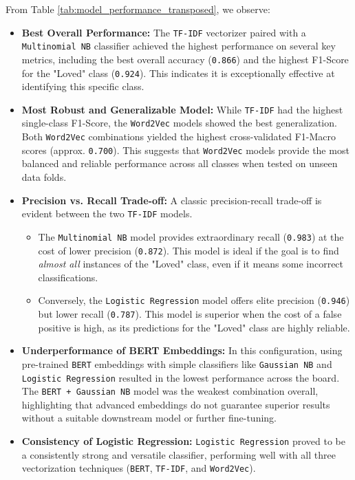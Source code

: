 \documentclass{article}
\begin{document}
From Table \ref{tab:model_performance_transposed}, we observe:
\begin{itemize}
    \item \textbf{Best Overall Performance:} The \texttt{TF-IDF} vectorizer paired with a \texttt{Multinomial NB} classifier achieved the highest performance on several key metrics, including the best overall accuracy (\texttt{0.866}) and the highest F1-Score for the "Loved" class (\texttt{0.924}). This indicates it is exceptionally effective at identifying this specific class.

    \item \textbf{Most Robust and Generalizable Model:} While \texttt{TF-IDF} had the highest single-class F1-Score, the \texttt{Word2Vec} models showed the best generalization. Both \texttt{Word2Vec} combinations yielded the highest cross-validated F1-Macro scores (approx. \texttt{0.700}). This suggests that \texttt{Word2Vec} models provide the most balanced and reliable performance across all classes when tested on unseen data folds.

    \item \textbf{Precision vs. Recall Trade-off:} A classic precision-recall trade-off is evident between the two \texttt{TF-IDF} models.
    \begin{itemize}
        \item The \texttt{Multinomial NB} model provides extraordinary recall (\texttt{0.983}) at the cost of lower precision (\texttt{0.872}). This model is ideal if the goal is to find \textit{almost all} instances of the "Loved" class, even if it means some incorrect classifications.
        \item Conversely, the \texttt{Logistic Regression} model offers elite precision (\texttt{0.946}) but lower recall (\texttt{0.787}). This model is superior when the cost of a false positive is high, as its predictions for the "Loved" class are highly reliable.
    \end{itemize}

    \item \textbf{Underperformance of BERT Embeddings:} In this configuration, using pre-trained \texttt{BERT} embeddings with simple classifiers like \texttt{Gaussian NB} and \texttt{Logistic Regression} resulted in the lowest performance across the board. The \texttt{BERT + Gaussian NB} model was the weakest combination overall, highlighting that advanced embeddings do not guarantee superior results without a suitable downstream model or further fine-tuning.

    \item \textbf{Consistency of Logistic Regression:} \texttt{Logistic Regression} proved to be a consistently strong and versatile classifier, performing well with all three vectorization techniques (\texttt{BERT}, \texttt{TF-IDF}, and \texttt{Word2Vec}).
\end{itemize}
\end{document}

